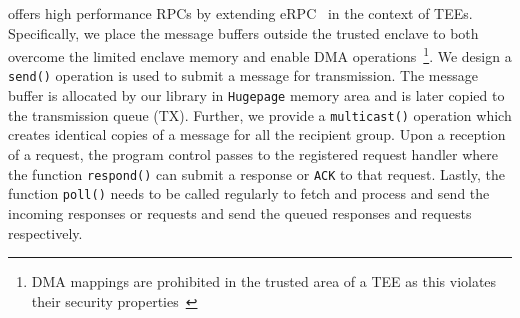  \projecttitle{} offers high performance RPCs by extending eRPC~\cite{erpc} in the context of TEEs. Specifically, we place the message buffers outside the trusted enclave to both overcome the limited enclave memory and enable DMA operations~\footnote{DMA mappings are prohibited in the trusted area of a TEE as this violates their security properties~\cite{intel-sgx}}. We design a \texttt{send()} operation is used to submit a message for transmission. The message buffer is allocated by our library in \texttt{Hugepage} memory area and is later copied to the transmission queue (TX). Further, we provide a \texttt{multicast()} operation which creates identical copies of a message for all the recipient group.    Upon a reception of a request, the program control passes to the registered request handler where the function \texttt{respond()} can submit a response or \texttt{ACK} to that request. Lastly, the function \texttt{poll()} needs to be called regularly to fetch and process and send the incoming responses or requests and send the queued responses and requests respectively. 


\fi
